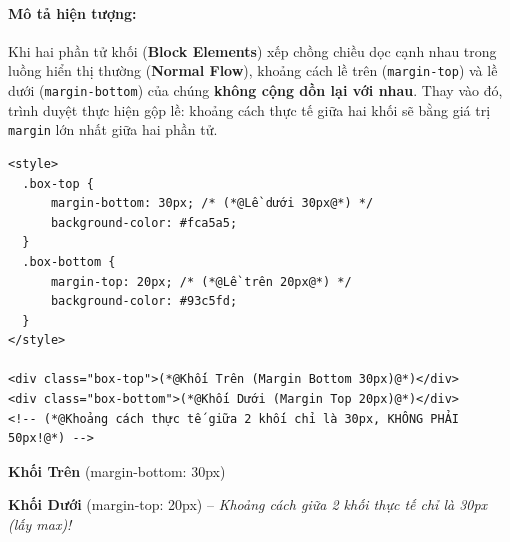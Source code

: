 \documentclass[11pt,oneside]{book}
\newcommand{\codeinline}[1]{\textcolor{accentOrange}{\texttt{#1}}}
\newcommand{\term}[1]{\textbf{\textcolor{primaryBlue}{#1}}}
\begin{document}
\paragraph{Mô tả hiện tượng:}
Khi hai phần tử khối (\term{Block Elements}) xếp chồng chiều dọc cạnh nhau trong luồng hiển thị thường (\term{Normal Flow}), khoảng cách lề trên (\codeinline{margin-top}) và lề dưới (\codeinline{margin-bottom}) của chúng \textbf{không cộng dồn lại với nhau}. Thay vào đó, trình duyệt thực hiện gộp lề: khoảng cách thực tế giữa hai khối sẽ bằng giá trị \codeinline{margin} lớn nhất giữa hai phần tử.

\begin{codeWindow}
\begin{lstlisting}[language=HTML5]
<style>
  .box-top {
      margin-bottom: 30px; /* (*@Lề dưới 30px@*) */
      background-color: #fca5a5;
  }
  .box-bottom {
      margin-top: 20px; /* (*@Lề trên 20px@*) */
      background-color: #93c5fd;
  }
</style>

<div class="box-top">(*@Khối Trên (Margin Bottom 30px)@*)</div>
<div class="box-bottom">(*@Khối Dưới (Margin Top 20px)@*)</div>
<!-- (*@Khoảng cách thực tế giữa 2 khối chỉ là 30px, KHÔNG PHẢI 50px!@*) -->
\end{lstlisting}
\end{codeWindow}

\begin{browserWindow}[Minh Họa Hiện Tượng Gộp Lề (Khoảng Cách Giữa 2 Khối = 30px Khỏi Bị Cộng Dồn)]
\begin{tcolorbox}[enhanced, colback=red!15, colframe=red!40, arc=4pt, boxrule=0.6pt, top=4pt, bottom=4pt, left=8pt, right=8pt]
\sffamily\small\textbf{Khối Trên} (margin-bottom: 30px)
\end{tcolorbox}
\par\vspace{12pt} %
\begin{tcolorbox}[enhanced, colback=blue!15, colframe=blue!40, arc=4pt, boxrule=0.6pt, top=4pt, bottom=4pt, left=8pt, right=8pt]
\sffamily\small\textbf{Khối Dưới} (margin-top: 20px) -- \textit{Khoảng cách giữa 2 khối thực tế chỉ là 30px (lấy max)!}
\end{tcolorbox}
\end{browserWindow}
\end{document}
